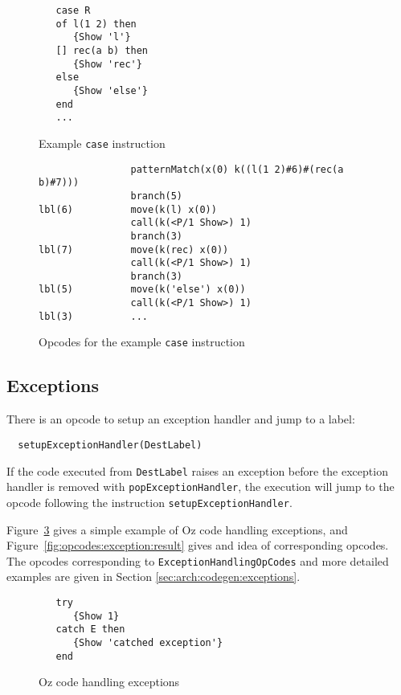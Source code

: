 \documentclass[a4paper]{memoir}
\begin{document}
\begin{figure}[ht]
\begin{lstlisting}
   case R
   of l(1 2) then
      {Show 'l'}
   [] rec(a b) then
      {Show 'rec'}
   else
      {Show 'else'}
   end
   ...
\end{lstlisting}
\caption{Example \lstinline!case! instruction}
\label{fig:target:ozcase}
\end{figure}

\begin{figure}[ht]
\begin{lstlisting}
                patternMatch(x(0) k((l(1 2)#6)#(rec(a b)#7)))
                branch(5)
lbl(6)          move(k(l) x(0))
                call(k(<P/1 Show>) 1)
                branch(3)
lbl(7)          move(k(rec) x(0))
                call(k(<P/1 Show>) 1)
                branch(3)
lbl(5)          move(k('else') x(0))
                call(k(<P/1 Show>) 1)
lbl(3)          ...
\end{lstlisting}
\caption{Opcodes for the example \lstinline!case! instruction}
\label{fig:target:case}
\end{figure}




\subsection{Exceptions}
There is an opcode to setup an exception handler and jump to a label:
\begin{lstlisting}
  setupExceptionHandler(DestLabel)
\end{lstlisting}
If the code executed from \lstinline!DestLabel! raises an exception before  the exception handler
is removed with \lstinline!popExceptionHandler!, the execution will jump to the
opcode following the instruction \lstinline!setupExceptionHandler!.

Figure~\ref{fig:opcodes:exception:oz} gives a simple example of Oz code
handling exceptions, and Figure~\ref{fig:opcodes:exception:result} gives and
idea of corresponding opcodes. The opcodes corresponding to
\lstinline!ExceptionHandlingOpCodes! and more detailed examples are given in
Section \ref{sec:arch:codegen:exceptions}.
\begin{figure}[ht]
\begin{lstlisting}
   try
      {Show 1}
   catch E then
      {Show 'catched exception'}
   end
\end{lstlisting}
\caption{Oz code handling exceptions}
\label{fig:opcodes:exception:oz}
\end{figure}
\end{document}
